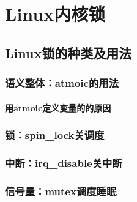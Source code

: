 
\part{Linux内核锁}

\chapter{Linux锁的种类及用法}

\section{语义整体：atmoic的用法}
\subsection{用atmoic定义变量的的原因}

\section{锁：spin\_lock关调度}

\section{中断：irq\_disable关中断}

\section{信号量：mutex调度睡眠}

